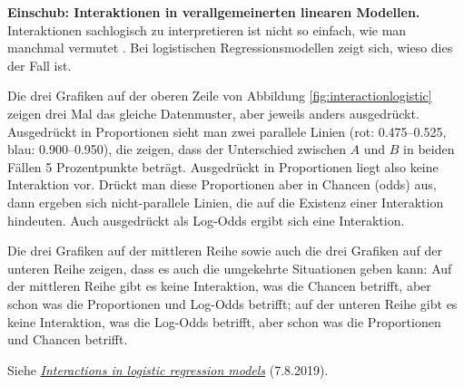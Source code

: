 \documentclass[oneside, 10pt]{book}\usepackage[]{graphicx}\usepackage[]{xcolor}
\begin{document}
\begin{framed}
\textbf{Einschub: Interaktionen in verallgemeinerten linearen Modellen.}
Interaktionen sachlogisch zu interpretieren
ist nicht so einfach, wie man manchmal vermutet
\citep[siehe][]{Wagenmakers2012}.
Bei logistischen Regressionsmodellen zeigt sich, wieso
dies der Fall ist.

Die drei Grafiken auf der oberen Zeile von Abbildung
\vref{fig:interactionlogistic}
zeigen drei Mal das gleiche Datenmuster, aber jeweils anders ausgedrückt.
Ausgedrückt in Proportionen sieht man zwei parallele Linien
(rot: 0.475--0.525, blau: 0.900--0.950), die zeigen, dass der Unterschied
zwischen $A$ und $B$ in beiden Fällen 5 Prozentpunkte beträgt.
Ausgedrückt in Proportionen liegt also keine Interaktion vor.
Drückt man diese Proportionen aber in Chancen (odds) aus, dann ergeben
sich nicht-parallele Linien, die auf die Existenz einer Interaktion
hindeuten. Auch ausgedrückt als Log-Odds ergibt sich eine Interaktion.

Die drei Grafiken auf der mittleren Reihe sowie auch die
drei Grafiken auf der unteren Reihe zeigen, dass es auch die umgekehrte
Situationen geben kann: Auf der mittleren Reihe gibt es keine Interaktion,
was die Chancen betrifft, aber schon was die Proportionen und Log-Odds betrifft;
auf der unteren Reihe gibt es keine Interaktion, was die Log-Odds betrifft,
aber schon was die Proportionen und Chancen betrifft.

Siehe \href{https://janhove.github.io/analysis/2019/08/07/interactions-logistic}{\textit{Interactions in logistic regression models}} (7.8.2019).
\end{framed}
\end{document}
